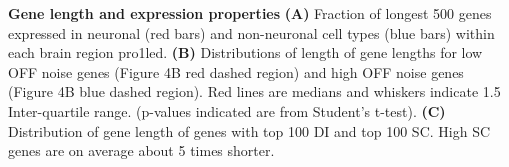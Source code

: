 \textbf{Gene length and expression properties}\textbf{ (A)} Fraction of longest 500 genes expressed in
neuronal (red bars) and non-neuronal cell types (blue bars) within each brain region pro1led. \textbf{(B)} Distributions of length of gene lengths for low OFF noise genes (Figure 4B red dashed region) and high OFF noise
genes (Figure 4B blue dashed region). Red lines are medians and whiskers indicate 1.5 Inter-quartile
range. (p-values indicated are from Student’s t-test). \textbf{(C)} Distribution of gene length of genes with top 100 DI and top 100 SC. High SC genes are on average about 5 times shorter.